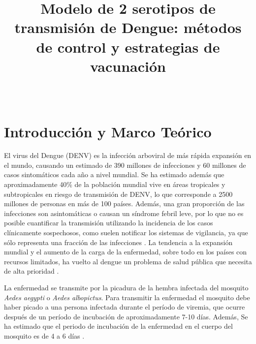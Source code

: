 \documentclass[journal]{IEEEtran}
\begin{document}


\title{Modelo de 2 serotipos de transmisión de Dengue: métodos de control y estrategias de vacunación}
\makeatletter
\let\Title\@title
\makeatother
\author{
\\
}
{\Title}
\maketitle




\section{\textbf{Introducción y Marco Teórico}}  

El virus del Dengue (DENV) es la infección arboviral de más rápida expansión en el mundo, causando un estimado de 390 millones de infecciones y 60 millones de casos sintomáticos cada año a nivel mundial. Se ha estimado además que aproximadamente 40\% de la población mundial vive en áreas tropicales y subtropicales en riesgo de transmisión de DENV, lo que corresponde a 2500 millones de personas en más de 100 países. Además, una gran proporción de las infecciones son asintomáticas o causan un síndrome febril leve, por lo que no es posible cuantificar la transmisión utilizando la incidencia de los casos clínicamente sospechosos, como suelen notificar los sistemas de vigilancia, ya que sólo representa una fracción de las infecciones \cite{article1}.
La tendencia a la expansión mundial y el aumento de la carga de la enfermedad, sobre todo en los países con recursos limitados, ha vuelto al dengue un problema de salud pública que necesita de alta prioridad \cite{Dengue_Col}.

La enfermedad se transmite por la picadura de la hembra infectada del mosquito \textit{Aedes aegypti} o \textit{Aedes albopictus}. Para transmitir la enfermedad el mosquito debe haber picado a una persona infectada durante el período de viremia, que ocurre después de un período de incubación de aproximadamente 7-10 días. Además, Se ha estimado que el periodo de incubación de la enfermedad en el cuerpo del mosquito es de 4 a 6 días \cite{article}. %
\end{document}
